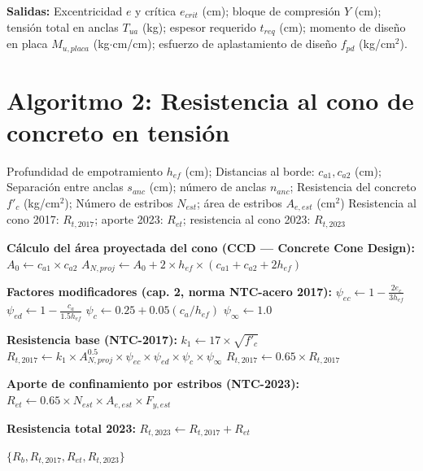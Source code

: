 \textbf{Salidas:} Excentricidad $e$ y crítica $e_{crit}$ (cm); bloque de compresión $Y$ (cm);
tensión total en anclas $T_{ua}$ (kg); espesor requerido $t_{req}$ (cm); momento de diseño
en placa $M_{u,placa}$ (kg$\cdot$cm/cm); esfuerzo de aplastamiento de diseño $f_{pd}$
(kg/cm$^2$).

\section{Algoritmo 2: Resistencia al cono de concreto en tensión}

\begin{algorithm}[H]
  \caption{\textbf{resistencia\_tensión\_cono}$(h_{ef}, c_{a1}, c_{a2}, s_{anc},
           n_{anc}, f'_c, N_{est}, A_{e,est})$}
  \label{alg:tension_cono}
  \begin{algorithmic}[1]
    \Require Profundidad de empotramiento $h_{ef}$ (cm);
             Distancias al borde: $c_{a1}, c_{a2}$ (cm);
             Separación entre anclas $s_{anc}$ (cm); número de anclas $n_{anc}$;
             Resistencia del concreto $f'_c$ (kg/cm$^2$);
             Número de estribos $N_{est}$; área de estribos $A_{e,est}$ (cm$^2$)
    \Ensure Resistencia al cono 2017: $R_{t,2017}$; aporte 2023: $R_{et}$;
            resistencia al cono 2023: $R_{t,2023}$

    \State \textbf{Cálculo del área proyectada del cono (CCD — Concrete Cone Design):}
    \State $A_{0} \gets c_{a1} \times c_{a2}$ \quad {}
    \State $A_{N,proj} \gets A_0 + 2 \times h_{ef} \times (c_{a1} + c_{a2} + 2h_{ef})$
      \quad {}

    \State \textbf{Factores modificadores (cap. 2, norma NTC-acero 2017):}
    \State $\psi_{ec} \gets 1 - \frac{2e_c}{3h_{ef}}$ \quad {}
    \State $\psi_{ed} \gets 1 - \frac{c_a}{1.5h_{ef}}$ \quad {}
    \State $\psi_{c} \gets 0.25 + 0.05(c_a/h_{ef})$ \quad {}
    \State $\psi_{\infty} \gets 1.0$ \quad {}

    \State \textbf{Resistencia base (NTC-2017):}
    \State $k_1 \gets 17 \times \sqrt{f'_c}$ \quad {}
    \State $R_{t,2017} \gets k_1 \times A_{N,proj}^{0.5} \times \psi_{ec} \times \psi_{ed}
      \times \psi_{c} \times \psi_{\infty}$
    \State $R_{t,2017} \gets 0.65 \times R_{t,2017}$ \quad {}

    \State \textbf{Aporte de confinamiento por estribos (NTC-2023):}
    \State $R_{et} \gets 0.65 \times N_{est} \times A_{e,est} \times F_{y,est}$
      \quad {}

    \State \textbf{Resistencia total 2023:}
    \State $R_{t,2023} \gets R_{t,2017} + R_{et}$

    \Return $\{R_b, R_{t,2017}, R_{et}, R_{t,2023}\}$
  \end{algorithmic}
\end{algorithm}

